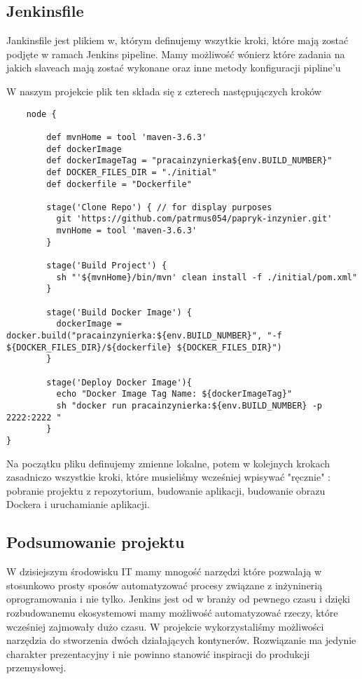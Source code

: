 \subsection{Jenkinsfile} 
Jankinsfile jest plikiem w, którym definujemy wszytkie kroki, które mają zostać podjęte w ramach Jenkins pipeline. Mamy możliwość wónierz które zadania na jakich slaveach mają zostać wykonane oraz inne metody konfiguracji pipline'u

W naszym projekcie plik ten składa się z czterech następujączych kroków 

\begin{lstlisting}
    node {  
        
	    def mvnHome = tool 'maven-3.6.3'
	    def dockerImage
	    def dockerImageTag = "pracainzynierka${env.BUILD_NUMBER}"
		def DOCKER_FILES_DIR = "./initial"
		def dockerfile = "Dockerfile"
	    
	    stage('Clone Repo') { // for display purposes
	      git 'https://github.com/patrmus054/papryk-inzynier.git'           
	      mvnHome = tool 'maven-3.6.3'
	    }    
	  
	    stage('Build Project') {
	      sh "'${mvnHome}/bin/mvn' clean install -f ./initial/pom.xml"
	    }
			
	    stage('Build Docker Image') {
	      dockerImage = docker.build("pracainzynierka:${env.BUILD_NUMBER}", "-f ${DOCKER_FILES_DIR}/${dockerfile} ${DOCKER_FILES_DIR}")
	    }
	   
	    stage('Deploy Docker Image'){
	      echo "Docker Image Tag Name: ${dockerImageTag}"
		  sh "docker run pracainzynierka:${env.BUILD_NUMBER} -p 2222:2222 "
	    }
}
\end{lstlisting}

Na początku pliku definujemy zmienne lokalne, potem w kolejnych krokach zasadniczo wszystkie kroki, które musieliśmy wcześniej wpisywać "ręcznie" : pobranie projektu z repozytorium, budowanie aplikacji, budowanie obrazu Dockera i uruchamianie aplikacji. 

\subsection{Podsumowanie projektu}

W dzisiejszym środowisku IT mamy mnogość narzędzi które pozwalają w stosunkowo prosty sposów automatyzować procesy związane z inżyninerią oprogramowania i nie tylko. Jenkins jest od w branży od pewnego czasu i dzięki rozbudowanemu ekosystemowi mamy możliwość automatyzować rzeczy, które wcześniej zajmowały dużo czasu. W projekcie wykorzystaliśmy możliwości narzędzia do stworzenia dwóch działających kontynerów. Rozwiązanie ma jedynie charakter prezentacyjny i nie powinno stanowić inspiracji do produkcji przemysłowej. 
